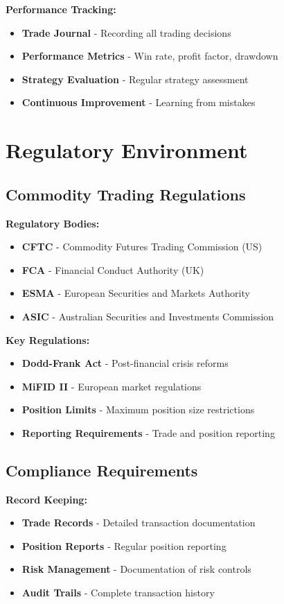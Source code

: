 \documentclass[12pt]{article}
\begin{document}
\textbf{Performance Tracking:}
\begin{itemize}
    \item \textbf{Trade Journal} - Recording all trading decisions
    \item \textbf{Performance Metrics} - Win rate, profit factor, drawdown
    \item \textbf{Strategy Evaluation} - Regular strategy assessment
    \item \textbf{Continuous Improvement} - Learning from mistakes
\end{itemize}

\section{Regulatory Environment}

\subsection{Commodity Trading Regulations}

\textbf{Regulatory Bodies:}
\begin{itemize}
    \item \textbf{CFTC} - Commodity Futures Trading Commission (US)
    \item \textbf{FCA} - Financial Conduct Authority (UK)
    \item \textbf{ESMA} - European Securities and Markets Authority
    \item \textbf{ASIC} - Australian Securities and Investments Commission
\end{itemize}

\textbf{Key Regulations:}
\begin{itemize}
    \item \textbf{Dodd-Frank Act} - Post-financial crisis reforms
    \item \textbf{MiFID II} - European market regulations
    \item \textbf{Position Limits} - Maximum position size restrictions
    \item \textbf{Reporting Requirements} - Trade and position reporting
\end{itemize}

\subsection{Compliance Requirements}

\textbf{Record Keeping:}
\begin{itemize}
    \item \textbf{Trade Records} - Detailed transaction documentation
    \item \textbf{Position Reports} - Regular position reporting
    \item \textbf{Risk Management} - Documentation of risk controls
    \item \textbf{Audit Trails} - Complete transaction history
\end{itemize}
\end{document}

